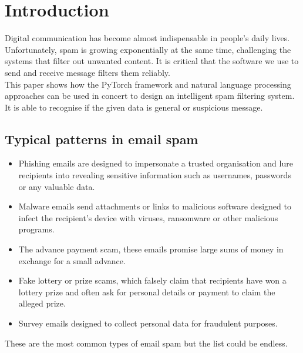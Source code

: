﻿\section{Introduction}
Digital communication has become almost indispensable in people's daily lives.
Unfortunately, spam is growing exponentially at the same time, challenging the systems that filter out unwanted content.
It is critical that the software we use to send and receive message filters them reliably. \\

This paper shows how the PyTorch framework and natural language processing approaches can be used in concert to design an intelligent spam filtering system.
It is able to recognise if the given data is general or suspicious message.

\subsection{Typical patterns in email spam}
\begin{itemize}
    \item{Phishing emails are designed to impersonate a trusted organisation and lure recipients into revealing sensitive information such as usernames, passwords or any valuable data.}
    \item{Malware emails send attachments or links to malicious software designed to infect the recipient's device with viruses, ransomware or other malicious programs.}
    \item{The advance payment scam, these emails promise large sums of money in exchange for a small advance.}
    \item{Fake lottery or prize scams, which falsely claim that recipients have won a lottery prize and often ask for personal details or payment to claim the alleged prize.}
    \item{Survey emails designed to collect personal data for fraudulent purposes.}
\end{itemize}

These are the most common types of email spam but the list could be endless.